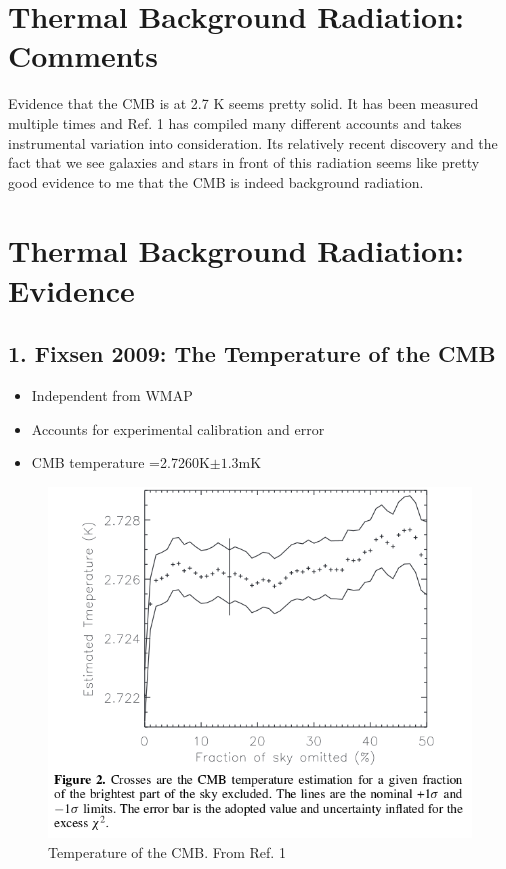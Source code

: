 \documentclass{article}
\begin{document}
\newpage
\section{Thermal Background Radiation: Comments}
Evidence that the CMB is at 2.7 K seems pretty solid. It has been measured multiple times and Ref. 1 has compiled many different accounts and takes instrumental variation into consideration. Its relatively recent discovery and the fact that we see galaxies and stars in front of this radiation seems like pretty good evidence to me that the CMB is indeed background radiation. 

\newpage
\section*{Thermal Background Radiation: Evidence}
\subsection*{1. Fixsen 2009: The Temperature of the CMB}
\begin{itemize}
\item Independent from WMAP
\item Accounts for experimental calibration and error
\item CMB temperature =2.7260K$\pm1.3$mK
\end{itemize}

\begin{figure}[h]
\begin{center}
\includegraphics[width=.8\textwidth,angle=0.]{cmbTemp.png}
\end{center}
\caption{Temperature of the CMB. From Ref. 1}
\end{figure}
\end{document}
